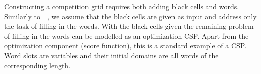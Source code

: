 
Constructing a competition grid requires both adding black cells and words.
Similarly to~\citeauthor{DBLP:conf/socs/BoteaB21}~,
we assume that the black cells are given as input
and address only the task of filling in the words.
With the black cells given the remaining problem of filling in the words can be modelled as
an optimization CSP. Apart from the optimization component (score function),
this is a standard example of a CSP.
Word slots are variables and their initial domains are all words
of the corresponding length.